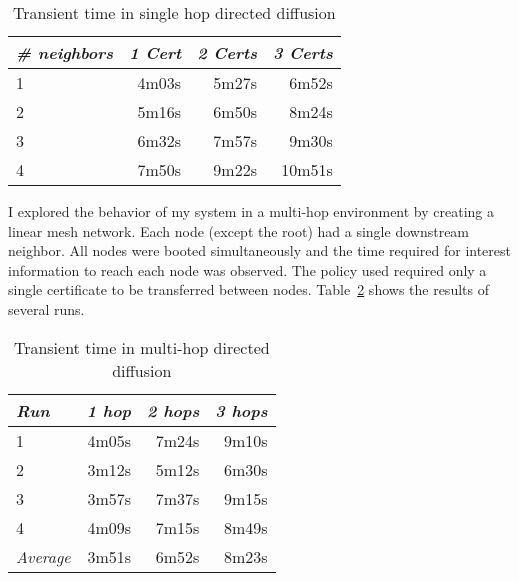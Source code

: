 \begin{table}[tbhp]
  \newcommand\T{\rule{0pt}{2.1ex}}
  \centering
  \caption{Transient time in single hop directed diffusion}
  {
  \begin{tabular}{|l|r|r|r|} \hline
    \textit{\# neighbors} \T & \textit{1 Cert }
                             & \textit{2 Certs}
                             & \textit{3 Certs} \\ \hline \hline

    1 \T &  4m03s & 5m27s &  6m52s \\ \hline
    2 \T &  5m16s & 6m50s &  8m24s \\ \hline
    3 \T &  6m32s & 7m57s &  9m30s \\ \hline
    4 \T &  7m50s & 9m22s & 10m51s \\ \hline
  \end{tabular}
  }
  \label{table-one-hop-transient}
\end{table}

I explored the behavior of my system in a multi-hop environment by creating a linear mesh
network. Each node (except the root) had a single downstream neighbor. All nodes were booted
simultaneously and the time required for interest information to reach each node was observed.
The policy used required only a single certificate to be transferred between nodes.
Table~\ref{table-multi-hop-transient} shows the results of several runs.

\begin{table}[tbhp]
  \newcommand\T{\rule{0pt}{2.1ex}}
  \centering
  \caption{Transient time in multi-hop directed diffusion}
  {
  \begin{tabular}{|l|r|r|r|} \hline
    \textit{Run} \T & \textit{1 hop }
                    & \textit{2 hops}
                    & \textit{3 hops} \\ \hline \hline

                   1 \T &  4m05s & 7m24s & 9m10s \\ \hline
                   2 \T &  3m12s & 5m12s & 6m30s \\ \hline
                   3 \T &  3m57s & 7m37s & 9m15s \\ \hline
                   4 \T &  4m09s & 7m15s & 8m49s \\ \hline
    \textit{Average} \T &  3m51s & 6m52s & 8m23s \\ \hline
  \end{tabular}
  }
  \label{table-multi-hop-transient}
\end{table}

